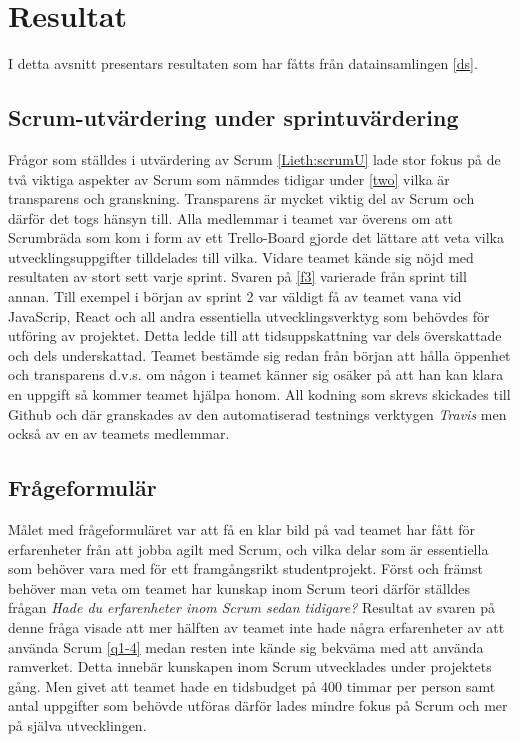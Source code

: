 \section{Resultat}
\label{sec:Lieth_Wahid-results}
I detta avsnitt presentars resultaten som har fåtts från datainsamlingen \ref{ds}.
\subsection{Scrum-utvärdering under sprintuvärdering}
Frågor som ställdes i utvärdering av Scrum \ref{Lieth:scrumU} lade stor fokus på de två viktiga aspekter av Scrum som nämndes tidigar under \ref{two} vilka är transparens och granskning.
Transparens är mycket viktig del av Scrum och därför det togs hänsyn till. Alla medlemmar i teamet var överens om att Scrumbräda som kom i form av ett Trello-Board gjorde det lättare att veta vilka 
utvecklingsuppgifter tilldelades till vilka. Vidare teamet kände sig nöjd med resultaten av stort sett varje sprint. Svaren på \ref{f3} varierade från sprint till annan. Till exempel i början av sprint 2 var väldigt få av teamet  
vana vid JavaScrip, React och all andra essentiella utvecklingsverktyg som behövdes för utföring av projektet. Detta ledde till att tidsuppskattning var dels överskattade och dels underskattad. Teamet bestämde sig redan från
början att hålla öppenhet och transparens d.v.s. om någon i teamet känner sig osäker på att han kan klara en uppgift så kommer teamet hjälpa honom. All kodning som skrevs skickades till Github och där granskades av den automatiserad testnings verktygen \textit{Travis} men också av en av teamets medlemmar.

\subsection{Frågeformulär}
Målet med frågeformuläret var att få en klar bild på vad teamet har fått för erfarenheter från att jobba agilt med Scrum, och vilka delar som är essentiella som behöver vara med för ett framgångsrikt studentprojekt. Först och främst behöver man veta om teamet har kunskap inom Scrum teori därför ställdes frågan \textit{Hade du erfarenheter inom Scrum sedan tidigare? }Resultat av svaren på denne fråga visade att mer hälften av teamet inte hade några erfarenheter av att använda Scrum \ref{q1-4} medan resten inte kände sig bekväma med att använda ramverket. Detta innebär kunskapen inom Scrum utvecklades under projektets gång. Men givet att teamet hade en tidsbudget på 400 timmar per person samt antal uppgifter som behövde utföras därför lades mindre fokus på Scrum och mer på själva utvecklingen.  

